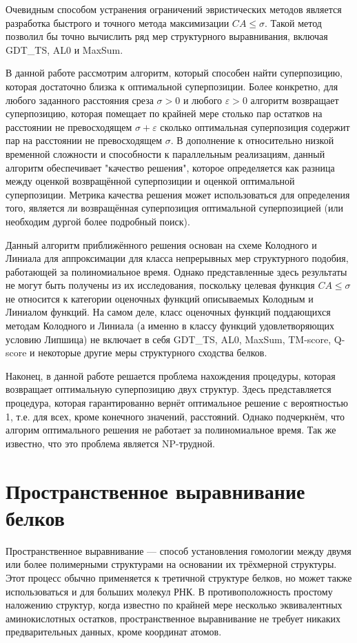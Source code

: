 \documentclass[a4paper]{extreport}
\newcommand{\eps}{\varepsilon}
\begin{document}
Очевидным способом устранения ограничений эвристических методов является разработка быстрого и точного метода максимизации $CA \leq \sigma$. Такой метод позволил бы точно вычислить ряд мер структурного выравнивания, включая GDT\_TS, AL0 и MaxSum.

В данной работе рассмотрим алгоритм, который способен найти суперпозицию, которая достаточно близка к оптимальной суперпозиции. Более конкретно, для любого заданного расстояния среза $\sigma > 0$ и любого $\eps > 0$ алгоритм возвращает суперпозицию, которая помещает по крайней мере столько пар остатков на расстоянии не превосходящем $\sigma + \eps$ сколько оптимальная суперпозиция содержит пар на расстоянии не превосходящем $\sigma$. В дополнение к относительно низкой временной сложности и способности к параллельным реализациям, данный алгоритм обеспечивает "качество решения", которое определяется как разница между оценкой возвращённой суперпозиции и оценкой оптимальной суперпозиции. Метрика качества решения может использоваться для определения того, является ли возвращённая суперпозиция оптимальной суперпозицией (или необходим дургой более подробный поиск).

Данный алгоритм приближённого решения основан на схеме Колодного и Линиала для аппроксимации для класса непрерывных мер структурного подобия, работающей за полиномиальное время. Однако представленные здесь  результаты не могут быть получены из их исследования, поскольку целевая функция $CA \leq \sigma$ не относится к категории оценочных функций описываемых Колодным и Линиалом функций. На самом деле, класс оценочных функций поддающихся методам Колодного и Линиала (а именно в классу функций удовлетворяющих условию Липшица) не включает в себя GDT\_TS, AL0, MaxSum, TM-score, Q-score и некоторые другие меры структурного сходства белков.

Наконец, в данной работе решается проблема нахождения процедуры, которая возвращает оптимальную суперпозицию двух структур. Здесь представляется процедура, которая гарантированно вернёт оптимальное решение с вероятностью 1, т.е. для всех, кроме конечного значений, расстояний. Однако подчеркнём, что алгорим оптимального решения не работает за полиномиальное время. Так же известно, что это проблема является NP-трудной.

\chapter{Пространственное выравнивание белков}

Пространственное выравнивание — способ установления гомологии между двумя или более полимерными структурами на основании их трёхмерной структуры. Этот процесс обычно применяется к третичной структуре белков, но может также использоваться и для больших молекул РНК. В противоположность простому наложению структур, когда известно по крайней мере несколько эквивалентных аминокислотных остатков, пространственное выравнивание не требует никаких предварительных данных, кроме координат атомов.
\end{document}
